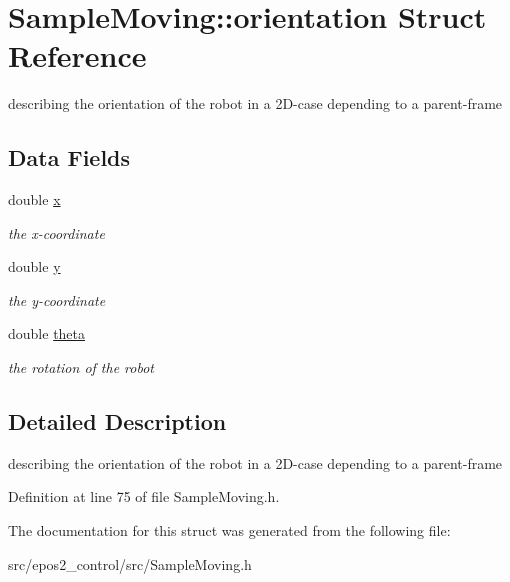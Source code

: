 \hypertarget{structSampleMoving_1_1orientation}{\section{Sample\-Moving\-:\-:orientation Struct Reference}
\label{structSampleMoving_1_1orientation}
}


describing the orientation of the robot in a 2\-D-\/case depending to a parent-\/frame  


\subsection*{Data Fields}
\begin{DoxyCompactItemize}
\item 
\hypertarget{structSampleMoving_1_1orientation_af6ec71c21c051419ecbbf62bf7e7fef3}{double \hyperlink{structSampleMoving_1_1orientation_af6ec71c21c051419ecbbf62bf7e7fef3}{x}}\label{structSampleMoving_1_1orientation_af6ec71c21c051419ecbbf62bf7e7fef3}

\begin{DoxyCompactList}\small\item\em the x-\/coordinate \end{DoxyCompactList}\item 
\hypertarget{structSampleMoving_1_1orientation_aefcbb80b73ad331a7fdbd57c41ff9c9a}{double \hyperlink{structSampleMoving_1_1orientation_aefcbb80b73ad331a7fdbd57c41ff9c9a}{y}}\label{structSampleMoving_1_1orientation_aefcbb80b73ad331a7fdbd57c41ff9c9a}

\begin{DoxyCompactList}\small\item\em the y-\/coordinate \end{DoxyCompactList}\item 
\hypertarget{structSampleMoving_1_1orientation_a3468c7e5138d21e92bdad18dbc4ce805}{double \hyperlink{structSampleMoving_1_1orientation_a3468c7e5138d21e92bdad18dbc4ce805}{theta}}\label{structSampleMoving_1_1orientation_a3468c7e5138d21e92bdad18dbc4ce805}

\begin{DoxyCompactList}\small\item\em the rotation of the robot \end{DoxyCompactList}\end{DoxyCompactItemize}


\subsection{Detailed Description}
describing the orientation of the robot in a 2\-D-\/case depending to a parent-\/frame 

Definition at line 75 of file Sample\-Moving.\-h.



The documentation for this struct was generated from the following file\-:\begin{DoxyCompactItemize}
\item 
src/epos2\-\_\-control/src/Sample\-Moving.\-h\end{DoxyCompactItemize}
